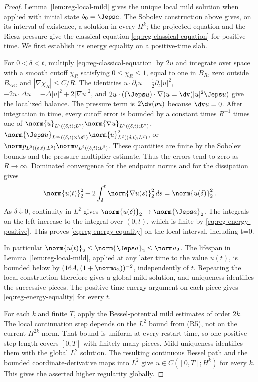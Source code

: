 \documentclass[11pt,reqno]{amsart}
\begin{document}
\begin{proof}
Lemma~\ref{lem:reg-local-mild} gives the unique local mild solution when
applied with initial state $b_0=\Jeps a$. The Sobolev construction above
gives, on its interval of existence, a solution
in every $H^k$; the projected equation and the Riesz pressure give the
classical equation \eqref{eq:reg-classical-equation} for positive time.
We first establish its energy equality on a positive-time slab.

For $0<\delta<t$, multiply \eqref{eq:reg-classical-equation} by $2u$ and
integrate over space with a smooth cutoff $\chi_R$ satisfying
$0\le\chi_R\le1$, equal to one in $B_R$, zero outside $B_{2R}$, and
$|\nabla\chi_R|\le C/R$. The
identities $u\cdot\partial_tu=\frac12\partial_t|u|^2$,
$-2u\cdot\Delta u=-\Delta|u|^2+2|\nabla u|^2$, and
$2u\cdot((\Jeps u)\cdot\nabla)u=\dv(|u|^2\Jeps u)$ give the localized
balance. The pressure term is $2\dv(pu)$ because $\dv u=0$. After
integration in time, every cutoff error is bounded by a constant times
$R^{-1}$ times one of
$\norm{u}_{L^2((\delta,t);L^2)}\norm{\nabla u}_{L^2((\delta,t);L^2)}$,
$\norm{\Jeps u}_{L^\infty((\delta,t)\times\R^3)}
\norm{u}_{L^2((\delta,t);L^2)}^2$, or
$\norm p_{L^2((\delta,t);L^2)}\norm u_{L^2((\delta,t);L^2)}$.
These quantities are finite by the Sobolev bounds and the pressure
multiplier estimate. Thus the errors tend to zero as $R\to\infty$.
Dominated convergence for the endpoint norms and for the dissipation gives
\begin{equation}\label{eq:reg-energy-positive}
  \norm{u(t)}_2^2+2\int_\delta^t\norm{\nabla u(s)}_2^2\,ds
  =\norm{u(\delta)}_2^2\,.
\end{equation}
As $\delta\downarrow0$, continuity in $L^2$ gives
$\norm{u(\delta)}_2\to\norm{\Jeps a}_2$. The integrals on the left
increase to the integral over $(0,t)$, which is finite by
\eqref{eq:reg-energy-positive}. This proves
\eqref{eq:reg-energy-equality} on the local interval, including t=0.

In particular $\norm{u(t)}_2\le\norm{\Jeps a}_2\le\norm a_2$. The
lifespan in Lemma~\ref{lem:reg-local-mild}, applied at any later time to the
value $u(t)$, is bounded below by
$(16A_\varepsilon(1+\norm a_2))^{-2}$, independently of $t$. Repeating the
local construction therefore gives a global mild solution, and uniqueness
identifies the successive pieces. The positive-time energy argument on each
piece gives \eqref{eq:reg-energy-equality} for every $t$.

For each $k$ and finite $T$, apply the Bessel-potential mild estimates of
order $2k$. The local continuation step depends on the $L^2$ bound from
(R5), not on the current $H^{2k}$ norm. That bound is uniform at every restart
time, so one positive step length covers $[0,T]$ with finitely many pieces.
Mild uniqueness identifies them with the global $L^2$ solution. The resulting
continuous Bessel path and the bounded coordinate-derivative maps into $L^2$
give $u\in C([0,T];H^k)$ for every $k$. This gives the asserted higher regularity globally.


\end{proof}
\end{document}
